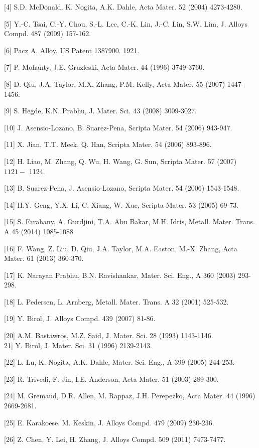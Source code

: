 \documentclass[10pt]{article}
\begin{document}
[4] S.D. McDonald, K. Nogita, A.K. Dahle, Acta Mater. 52 (2004) 4273-4280.

[5] Y.-C. Tsai, C.-Y. Chou, S.-L. Lee, C.-K. Lin, J.-C. Lin, S.W. Lim, J. Alloys Compd. 487 (2009) 157-162.

[6] Pacz A. Alloy. US Patent 1387900. 1921.

[7] P. Mohanty, J.E. Gruzleski, Acta Mater. 44 (1996) 3749-3760.

[8] D. Qiu, J.A. Taylor, M.X. Zhang, P.M. Kelly, Acta Mater. 55 (2007) 1447-1456.

[9] S. Hegde, K.N. Prabhu, J. Mater. Sci. 43 (2008) 3009-3027.

[10] J. Asensio-Lozano, B. Suarez-Pena, Scripta Mater. 54 (2006) 943-947.

[11] X. Jian, T.T. Meek, Q. Han, Scripta Mater. 54 (2006) 893-896.

[12] H. Liao, M. Zhang, Q. Wu, H. Wang, G. Sun, Scripta Mater. 57 (2007) $1121-$ 1124.

[13] B. Suarez-Pena, J. Asensio-Lozano, Scripta Mater. 54 (2006) 1543-1548.

[14] H.Y. Geng, Y.X. Li, C. Xiang, W. Xue, Scripta Mater. 53 (2005) 69-73.

[15] S. Farahany, A. Ourdjini, T.A. Abu Bakar, M.H. Idris, Metall. Mater. Trans. A 45 (2014) 1085-1088

[16] F. Wang, Z. Liu, D. Qiu, J.A. Taylor, M.A. Easton, M.-X. Zhang, Acta Mater. 61 (2013) 360-370.

[17] K. Narayan Prabhu, B.N. Ravishankar, Mater. Sci. Eng., A 360 (2003) 293-298.

[18] L. Pedersen, L. Arnberg, Metall. Mater. Trans. A 32 (2001) 525-532.

[19] Y. Birol, J. Alloys Compd. 439 (2007) 81-86.

[20] A.M. Bastawros, M.Z. Said, J. Mater. Sci. 28 (1993) 1143-1146.\\
21] Y. Birol, J. Mater. Sci. 31 (1996) 2139-2143.

[22] L. Lu, K. Nogita, A.K. Dahle, Mater. Sci. Eng., A 399 (2005) 244-253.

[23] R. Trivedi, F. Jin, I.E. Anderson, Acta Mater. 51 (2003) 289-300.

[24] M. Gremaud, D.R. Allen, M. Rappaz, J.H. Perepezko, Acta Mater. 44 (1996) 2669-2681.

[25] E. Karakoese, M. Keskin, J. Alloys Compd. 479 (2009) 230-236.

[26] Z. Chen, Y. Lei, H. Zhang, J. Alloys Compd. 509 (2011) 7473-7477.
\end{document}
